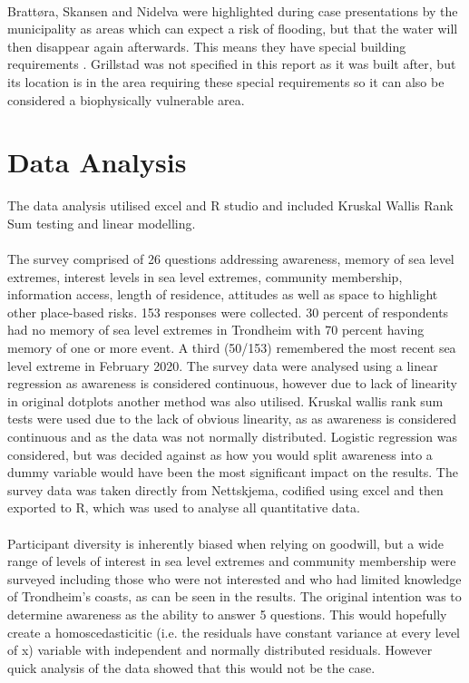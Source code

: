 \paragraph{}
Brattøra, Skansen and Nidelva were highlighted during case presentations by the municipality as areas which can expect a risk of flooding, but that the water will then disappear again afterwards. This means they have special building requirements \cite{hanssen_saksframlegg_2013}. Grillstad was not specified in this report as it was built after, but its location is in the area requiring these special requirements so it can also be considered a biophysically vulnerable area.  

 
\section{Data Analysis}
 The data analysis utilised excel and R studio and included Kruskal Wallis Rank Sum testing and linear modelling. 
\paragraph{}
  The survey comprised of 26 questions addressing awareness, memory of sea level extremes, interest levels in sea level extremes, community membership, information access, length of residence, attitudes as well as space to highlight other place-based risks. 153 responses were collected. 30 percent of respondents had no memory of sea level extremes in Trondheim with 70 percent having memory of one or more event. A third (50/153) remembered the most recent sea level extreme in February 2020. The survey data were analysed using a linear regression as awareness is considered continuous, however due to lack of linearity in original dotplots another method was also utilised. Kruskal wallis rank sum tests were used due to the lack of obvious linearity, as as awareness is considered continuous and as the data was not normally distributed. Logistic regression was considered, but was decided against as how you would split awareness into a dummy variable would have been the most significant impact on the results. The survey data was taken directly from Nettskjema, codified using excel and then exported to R, which was used to analyse all quantitative data. 
\paragraph{}
  Participant diversity is inherently biased when relying on goodwill, but a wide range of levels of interest in sea level extremes and community membership were surveyed including those who were not interested and who had limited knowledge of Trondheim’s coasts, as can be seen in the results. The original intention was to determine awareness as the ability to answer 5 questions. This would hopefully create a homoscedasticitic (i.e. the residuals have constant variance at every level of x) variable with independent and normally distributed residuals. However quick analysis of the data showed that this would not be the case.
